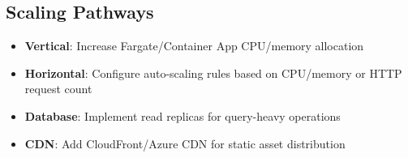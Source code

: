\subsection{Scaling Pathways}

\begin{itemize}
    \item \textbf{Vertical}: Increase Fargate/Container App CPU/memory allocation
    \item \textbf{Horizontal}: Configure auto-scaling rules based on CPU/memory or HTTP request count
    \item \textbf{Database}: Implement read replicas for query-heavy operations
    \item \textbf{CDN}: Add CloudFront/Azure CDN for static asset distribution
\end{itemize}

